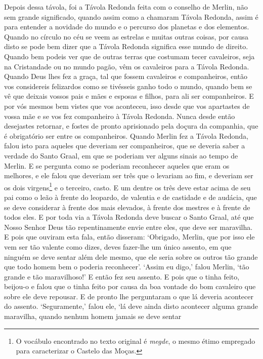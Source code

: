 Depois dessa távola, foi a Távola Redonda feita com o conselho de Merlin, não
sem grande significado, quando assim como a chamaram Távola Redonda, assim é
para entender a novidade do mundo e o percurso dos planetas e dos elementos.
Quando no círculo no céu se veem as estrelas e muitas outras coisas, por causa
disto se pode bem dizer que a Távola Redonda significa esse mundo de direito.
Quando bem podeis ver que de outras terras que costumam tecer cavaleiros, seja
na Cristandade ou no mundo pagão, vêm os cavaleiros para a Távola Redonda.
Quando Deus lhes fez a graça, tal que fossem cavaleiros e companheiros, então
vos considereis felizardos como se tivésseis ganho todo o mundo, quando bem se
vê que deixais vossos pais e mães e esposas e filhos, para ali ser
companheiros. E por vós mesmos bem vistes que vos aconteceu, isso desde que vos
apartastes de vossa mãe e se vos fez companheiro à Távola Redonda. Nunca desde
então desejastes retornar, e fostes de pronto aprisionado pela doçura da
companhia, que é obrigatório ser entre os companheiros. Quando Merlin fez a
Távola Redonda, falou isto para aqueles que deveriam ser companheiros, que se
deveria saber a verdade do Santo Graal, em que se poderiam ver alguns sinais ao
tempo de Merlin. E se pergunta como se poderiam reconhecer aqueles que eram os
melhores, e ele falou que deveriam ser três que o levariam ao fim, e deveriam
ser os dois virgens\footnote{ O vocábulo encontrado no texto original é
\textit{megde}, o mesmo étimo empregado para caracterizar o Castelo das Moças.}  
e o terceiro, casto. E um dentre os três deve estar acima de seu
pai como o leão à frente do leopardo, de valentia e de castidade e de audácia,
que se deve considerar à frente dos mais elevados, à frente dos mestres e à
frente de todos eles. E por toda via a Távola Redonda deve buscar o Santo
Graal, até que Nosso Senhor Deus tão repentinamente envie entre eles, que deve
ser maravilha. E pois que ouviram esta fala, então disseram: ‘Obrigado, Merlin,
que por isso ele vem ser tão valente como dizes, deves fazer-lhe um único
assento, em que ninguém se deve sentar além dele mesmo,  que ele seria sobre os
outros tão grande que todo homem bem o poderia reconhecer’. ‘Assim eu digo,’
falou Merlin, ‘tão grande e tão maravilhoso!’ E então fez seu assento. E pois
que o tinha feito, beijou-o e falou que o tinha feito por causa da boa vontade
do bom cavaleiro que sobre ele deve repousar. E de pronto lhe perguntaram o que
lá deveria acontecer do assento. ‘Seguramente,’ falou ele, `lá deve ainda disto
acontecer alguma grande maravilha, quando nenhum homem jamais se deve sentar
